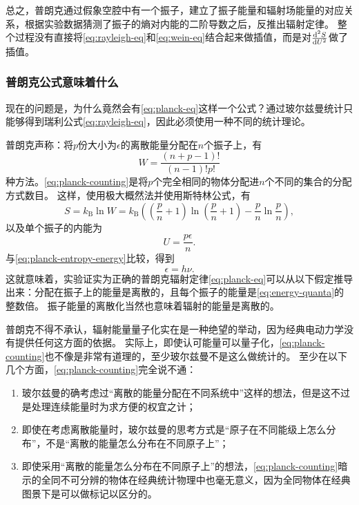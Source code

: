 \documentclass[UTF8, a4paper]{ctexart}
\begin{document}
总之，普朗克通过假象空腔中有一个振子，建立了振子能量和辐射场能量的对应关系，根据实验数据猜测了振子的熵对内能的二阶导数之后，反推出辐射定律。
整个过程没有直接将\eqref{eq:rayleigh-eq}和\eqref{eq:wein-eq}结合起来做插值，而是对$\dv[2]{S}{U}$做了插值。

\subsubsection{普朗克公式意味着什么}

现在的问题是，为什么竟然会有\eqref{eq:planck-eq}这样一个公式？通过玻尔兹曼统计只能够得到瑞利公式\eqref{eq:rayleigh-eq}，因此必须使用一种不同的统计理论。

普朗克声称：将$p$份大小为$\epsilon$的离散能量分配在$n$个振子上，有
\begin{equation}
    W = \frac{(n+p-1)!}{(n-1)!p!}
    \label{eq:planck-counting}
\end{equation}
种方法。\eqref{eq:planck-counting}是将$p$个完全相同的物体分配进$n$个不同的集合的分配方式数目。
这样，使用极大概然法并使用斯特林公式，有
\[
    S = k_\text{B} \ln W = k_\text{B} \left( \left(\frac{p}{n} + 1\right) \ln \left(\frac{p}{n} + 1 \right) - \frac{p}{n} \ln \frac{p}{n} \right),
\]
以及单个振子的内能为
\[
    U = \frac{p \epsilon}{n}.
\]
与\eqref{eq:planck-entropy-energy}比较，得到
\begin{equation}
    \epsilon = h \nu.
    \label{eq:energy-quanta}
\end{equation}
这就意味着，实验证实为正确的普朗克辐射定律\eqref{eq:planck-eq}可以从以下假定推导出来：分配在振子上的能量是离散的，且每个振子的能量是\eqref{eq:energy-quanta}的整数倍。
振子能量的离散化当然也意味着辐射的能量是离散的。

普朗克不得不承认，辐射能量量子化实在是一种绝望的举动，因为经典电动力学没有提供任何这方面的依据。
实际上，即使认可能量可以量子化，\eqref{eq:planck-counting}也不像是非常有道理的，至少玻尔兹曼不是这么做统计的。
至少在以下几个方面，\eqref{eq:planck-counting}完全说不通：
\begin{enumerate}
    \item 玻尔兹曼的确考虑过“离散的能量分配在不同系统中”这样的想法，但是这不过是处理连续能量时为求方便的权宜之计；
    \item 即使在考虑离散能量时，玻尔兹曼的思考方式是“原子在不同能级上怎么分布”，不是“离散的能量怎么分布在不同原子上”；
    \item 即使采用“离散的能量怎么分布在不同原子上”的想法，\eqref{eq:planck-counting}暗示的全同不可分辨的物体在经典统计物理中也毫无意义，因为全同物体在经典图景下是可以做标记以区分的。
\end{enumerate}
\end{document}
